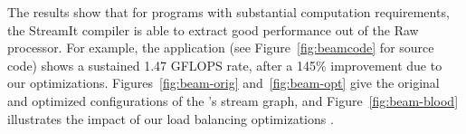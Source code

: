 The results show that for programs with substantial computation
requirements, the StreamIt compiler is able to extract good
performance out of the Raw processor.  For example, the \BeamFormer
application (see Figure~\ref{fig:beamcode} for source code) shows a
sustained 1.47 GFLOPS rate, after a 145\% improvement due to our
optimizations.  Figures~\ref{fig:beam-orig} and~\ref{fig:beam-opt}
give the original and optimized configurations of the \BeamFormer's
stream graph, and Figure~\ref{fig:beam-blood} illustrates the impact
of our load balancing optimizations .
%

                         
                            
